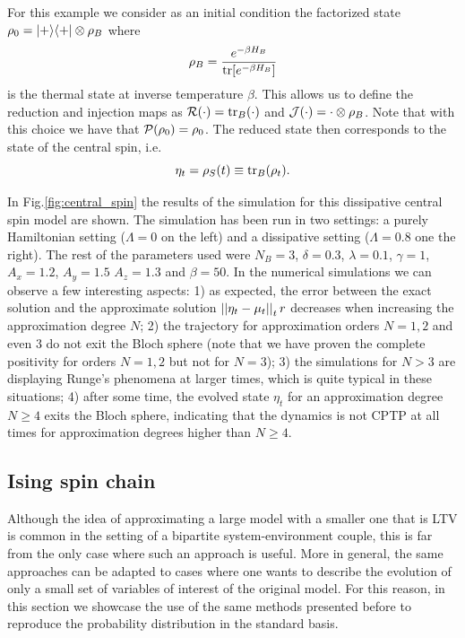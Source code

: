 \documentclass[10pt,aps,pra,twocolumn,showpacs,superscriptaddress,nobalancelastpage,notitlepage,nofootinbib,longbibliography]{revtex4-2}
\begin{document}
For this example we consider as an initial condition the factorized state $\rho_0 = \left\vert + \middle>\middle< + \right\vert \otimes \rho_B$
where \[\rho_B = \frac{e^{-\beta H_B}}{{\rm tr}[e^{-\beta H_B}]}\]
is the thermal state at inverse temperature $\beta$. 
This allows us to define the reduction and injection maps as $\mathcal{R}(\cdot) = {\rm tr}_B(\cdot)$ and $\mathcal{J}(\cdot) = \cdot\otimes\rho_B$. Note that with this choice we have that $\mathcal{P}(\rho_0)=\rho_0$.
The reduced state then corresponds to the state of the central spin, i.e. 
\[\eta_t = \rho_S(t) \equiv {\rm tr}_B(\rho_t).\]

In Fig.\ref{fig:central_spin} the results of the simulation for this dissipative central spin model are shown. The simulation has been run in two settings: a purely Hamiltonian setting ($\Lambda=0$ on the left) and a dissipative setting ($\Lambda=0.8$ one the right). The rest of the parameters used were $N_B = 3$, $\delta=0.3$, $\lambda=0.1$, $\gamma=1$, $A_x=1.2$, $A_y=1.5$ $A_z=1.3$ and $\beta=50$. In the numerical simulations we can observe a few interesting aspects: 1) as expected, the error between the exact solution and the approximate solution $\left|\left| \eta_t-\mu_t \right|\right|_tr$ decreases when increasing the approximation degree $N$; 2) the trajectory for approximation orders $N=1,2$ and even $3$ do not exit the Bloch sphere (note that we have proven the complete positivity for orders $N=1,2$ but not for $N=3$); 3) the simulations for $N>3$ are displaying Runge's phenomena at larger times, which is quite typical in these situations; 4) after some time, the evolved state $\eta_t$ for an approximation degree $N\geq4$ exits the Bloch sphere, indicating that the dynamics is not CPTP at all times for approximation degrees higher than $N\geq4$.


\subsection{Ising spin chain}
\label{sec:ising_model}

Although the idea of approximating a large model with a smaller one that is LTV is common in the setting of a bipartite system-environment couple, this is far from the only case where such an approach is useful. More in general, the same approaches can be adapted to cases where one wants to describe the evolution of only a small set of variables of interest of the original model. For this reason, in this section we showcase the use of the same methods presented before to reproduce the probability distribution in the standard basis. 
\end{document}
